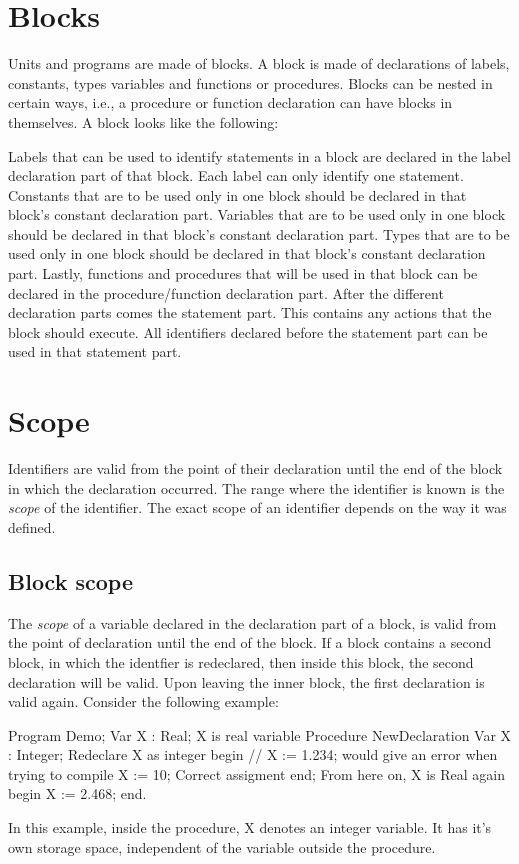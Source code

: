 \documentclass{report}
\begin{document}
\section{Blocks}
Units and programs are made of blocks. A block is made of declarations of 
labels, constants, types variables and functions or procedures. Blocks can
be nested in certain ways, i.e., a procedure or function declaration can
have blocks in themselves.
A block looks like the following:

Labels that can be used to identify statements in a block are declared in
the label declaration part of that block. Each label can only identify one
statement.
Constants that are to be used only in one block should be declared in that
block's constant declaration part.
Variables that are to be used only in one block should be declared in that
block's constant declaration part.
Types that are to be used only in one block should be declared in that
block's constant declaration part.
Lastly, functions and procedures that will be used in that block can be
declared in the procedure/function declaration part.
After the different declaration parts comes the statement part. This
contains any actions that the block should execute.
All identifiers declared before the statement part can be used in that 
statement part.
\section{Scope}
Identifiers are valid from the point of their declaration until the end of
the block in which the declaration occurred. The range where the identifier
is known is the {\em scope} of the identifier. The exact scope of an
identifier depends on the way it was defined.
\subsection{Block scope}
The {\em scope} of a variable declared in the declaration part of a block,
is valid from the point of declaration until the end of the block.
If a block contains a second block, in which the identfier is
redeclared, then inside this block, the second declaration will be valid.
Upon leaving the inner block, the first declaration is valid again.
Consider the following example:
\begin{listing}
Program Demo;
Var X : Real;
{ X is real variable }
Procedure NewDeclaration
Var X : Integer;  { Redeclare X as integer}
begin
 // X := 1.234; {would give an error when trying to compile}
 X := 10; { Correct assigment}
end;
{ From here on, X is Real again}
begin
 X := 2.468;
end.
\end{listing}
In this example, inside the procedure, X denotes an integer variable.
It has it's own storage space, independent of the variable  outside
the procedure.
\end{document}

